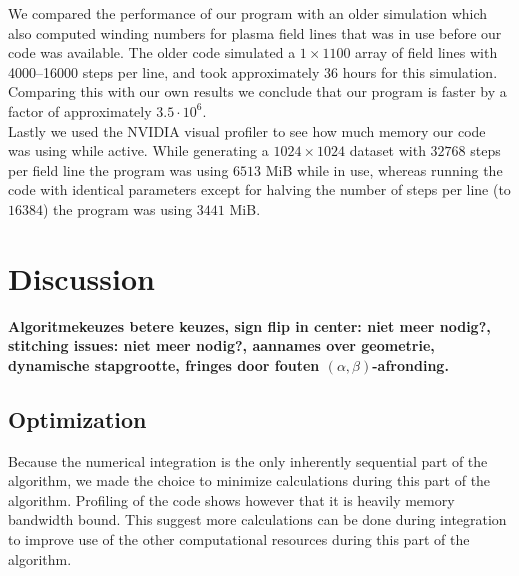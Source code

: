 \documentclass{article}
\begin{document}
We compared the performance of our program with an older simulation which also computed winding numbers for plasma field lines that was in use before our code was available. The older code simulated a $1\times 1100$ array of field lines with 4000--16000 steps per line, and took approximately $36$ hours for this simulation. Comparing this with our own results we conclude that our program is faster by a factor of approximately $3.5\cdot 10^6$.\\

Lastly we used the NVIDIA visual profiler to see how much memory our code was using while active. While generating a $1024\times 1024$ dataset with $32768$ steps per field line the program was using $6513$ MiB while in use, whereas running the code with identical parameters except for halving the number of steps per line (to $16384$) the program was using $3441$ MiB.


\section{Discussion}
{\bf Algoritmekeuzes \textrightarrow betere keuzes, sign flip in center: niet meer nodig?, stitching issues: niet meer nodig?, aannames over geometrie, dynamische stapgrootte, fringes door fouten $(\alpha,\beta)$-afronding.}\\

\subsection{Optimization}
Because the numerical integration is the only inherently sequential part of the algorithm, we made the choice to minimize calculations during this part of the algorithm. Profiling of the code shows however that it is heavily memory bandwidth bound. This suggest more calculations can be done during integration to improve use of the other computational resources during this part of the algorithm.\\
\end{document}
